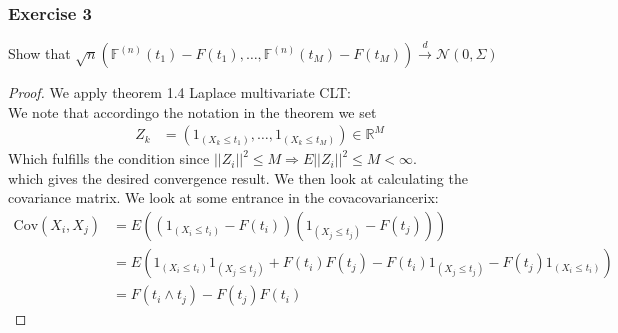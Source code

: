 \documentclass{article}
\begin{document}
\subsubsection{Exercise 3}
Show that $\sqrt{n}(\mathbb{F}^{(n)}(t_1) - F(t_1), \dots, \mathbb{F}^{(n)}(t_M) - F(t_M)) \overset{d}{\rightarrow} \mathcal{N}(0, \Sigma) $
\begin{proof}
 We apply theorem 1.4 Laplace multivariate CLT:\\
 We note that accordingo the notation in the theorem we set\\
 \begin{align*}
     Z_k &= (1_{(X_k \leq t_1)},\dots , 1_{(X_k \leq t_M)}) \in \mathbb{R}^M
 \end{align*}
 Which fulfills the condition since $||Z_i||^2 \leq M \Rightarrow E||Z_i||^2 \leq M < \infty$.
 \\
 which gives the desired convergence result. We then look at calculating the covariance matrix. 
 We look at some entrance in the covacovariancerix:
 \begin{align*}
     \text{Cov}(X_i, X_j) &= E((1_{(X_i \leq t_i)} - F(t_i))(1_{(X_j \leq t_j)} - F(t_j))) \\ 
     &= E(1_{(X_i \leq t_i)}1_{(X_j \leq t_j)} + F(t_i)F(t_j) - F(t_i)1_{(X_j \leq t_j)} -F(t_j)1_{(X_i \leq t_i)})\\
     &= F(t_i \land t_j) - F(t_j)F(t_i)
 \end{align*}
\end{proof}
\end{document}
